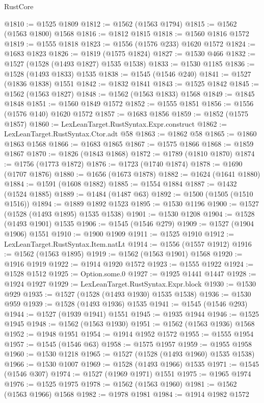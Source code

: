 \begin{lexlean}{RustCore}
\begin{coremodule}
@1810 := @1525 @1809
@1812 := @1562 (@1563 @1794)
@1815 := @1562 (@1563 @1800) @1568
@1816 := @1812 @1815
@1818 := @1560 @1816 @1572
@1819 := @1555 @1818
@1823 := @1556 (@1576 @233) @1620 @1572
@1824 := @1683 @1823
@1826 := @1819 (@1575 @1824)
@1827 := @1530 @466
@1832 := @1527 (@1528 (@1493 @1827) @1535 @1538)
@1833 := @1530 @1185
@1836 := @1528 (@1493 @1833) @1535
@1838 := @1545 (@1546 @240)
@1841 := @1527 (@1836 @1838) @1551
@1842 := @1832 @1841
@1843 := @1525 @1842
@1845 := @1562 (@1563 @1827)
@1848 := @1562 (@1563 @1833) @1568
@1849 := @1845 @1848
@1851 := @1560 @1849 @1572
@1852 := @1555 @1851
@1856 := @1556 (@1576 @140) @1620 @1572
@1857 := @1683 @1856
@1859 := @1852 (@1575 @1857)
@1860 := LexLeanTarget.RustSyntax.Expr.construct
@1862 := LexLeanTarget.RustSyntax.Ctor.adt @58
@1863 := @1862 @58
@1865 := @1860 @1863 @1568
@1866 := @1683 @1865
@1867 := @1575 @1866
@1868 := @1859 @1867
@1870 := @1826 (@1843 @1868)
@1872 := @1789 (@1810 @1870)
@1874 := @1756 (@1773 @1872)
@1876 := @1723 (@1740 @1874)
@1878 := @1690 (@1707 @1876)
@1880 := @1656 (@1673 @1878)
@1882 := @1624 (@1641 @1880)
@1884 := @1591 (@1608 @1882)
@1885 := @1554 @1884
@1887 := @1432 (@1524 @1885)
@1889 := @1484 (@1487 @63)
@1892 := @1500 (@1505 (@1510 @1516))
@1894 := @1889 @1892 @1523
@1895 := @1530 @1196
@1900 := @1527 (@1528 (@1493 @1895) @1535 @1538)
@1901 := @1530 @1208
@1904 := @1528 (@1493 @1901) @1535
@1906 := @1545 (@1546 @279)
@1909 := @1527 (@1904 @1906) @1551
@1910 := @1900 @1909
@1911 := @1525 @1910
@1912 := LexLeanTarget.RustSyntax.Item.natLt
@1914 := @1556 (@1557 @1912)
@1916 := @1562 (@1563 @1895)
@1919 := @1562 (@1563 @1901) @1568
@1920 := @1916 @1919
@1922 := @1914 @1920 @1572
@1923 := @1555 @1922
@1924 := @1528 @1512
@1925 := Option.some.{0}
@1927 := @1925 @1441 @1447
@1928 := @1924 @1927
@1929 := LexLeanTarget.RustSyntax.Expr.block
@1930 := @1530 @929
@1935 := @1527 (@1528 (@1493 @1930) @1535 @1538)
@1936 := @1530 @959
@1939 := @1528 (@1493 @1936) @1535
@1941 := @1545 (@1546 @293)
@1944 := @1527 (@1939 @1941) @1551
@1945 := @1935 @1944
@1946 := @1525 @1945
@1948 := @1562 (@1563 @1930)
@1951 := @1562 (@1563 @1936) @1568
@1952 := @1948 @1951
@1954 := @1914 @1952 @1572
@1955 := @1555 @1954
@1957 := @1545 (@1546 @63)
@1958 := @1575 @1957
@1959 := @1955 @1958
@1960 := @1530 @1218
@1965 := @1527 (@1528 (@1493 @1960) @1535 @1538)
@1966 := @1530 @1007
@1969 := @1528 (@1493 @1966) @1535
@1971 := @1545 (@1546 @307)
@1974 := @1527 (@1969 @1971) @1551
@1975 := @1965 @1974
@1976 := @1525 @1975
@1978 := @1562 (@1563 @1960)
@1981 := @1562 (@1563 @1966) @1568
@1982 := @1978 @1981
@1984 := @1914 @1982 @1572

\end{coremodule}
\end{lexlean}
